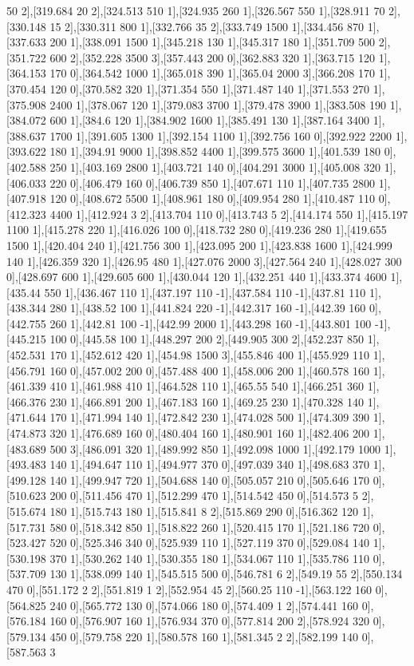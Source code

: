 {50 2],[319.684 20 2],[324.513 510 1],[324.935 260 1],[326.567 550 1],[328.911 70 2],[330.148 15 2],[330.311 800 1],[332.766 35 2],[333.749 1500 1],[334.456 870 1],[337.633 200 1],[338.091 1500 1],[345.218 130 1],[345.317 180 1],[351.709 500 2],[351.722 600 2],[352.228 3500 3],[357.443 200 0],[362.883 320 1],[363.715 120 1],[364.153 170 0],[364.542 1000 1],[365.018 390 1],[365.04 2000 3],[366.208 170 1],[370.454 120 0],[370.582 320 1],[371.354 550 1],[371.487 140 1],[371.553 270 1],[375.908 2400 1],[378.067 120 1],[379.083 3700 1],[379.478 3900 1],[383.508 190 1],[384.072 600 1],[384.6 120 1],[384.902 1600 1],[385.491 130 1],[387.164 3400 1],[388.637 1700 1],[391.605 1300 1],[392.154 1100 1],[392.756 160 0],[392.922 2200 1],[393.622 180 1],[394.91 9000 1],[398.852 4400 1],[399.575 3600 1],[401.539 180 0],[402.588 250 1],[403.169 2800 1],[403.721 140 0],[404.291 3000 1],[405.008 320 1],[406.033 220 0],[406.479 160 0],[406.739 850 1],[407.671 110 1],[407.735 2800 1],[407.918 120 0],[408.672 5500 1],[408.961 180 0],[409.954 280 1],[410.487 110 0],[412.323 4400 1],[412.924 3 2],[413.704 110 0],[413.743 5 2],[414.174 550 1],[415.197 1100 1],[415.278 220 1],[416.026 100 0],[418.732 280 0],[419.236 280 1],[419.655 1500 1],[420.404 240 1],[421.756 300 1],[423.095 200 1],[423.838 1600 1],[424.999 140 1],[426.359 320 1],[426.95 480 1],[427.076 2000 3],[427.564 240 1],[428.027 300 0],[428.697 600 1],[429.605 600 1],[430.044 120 1],[432.251 440 1],[433.374 4600 1],[435.44 550 1],[436.467 110 1],[437.197 110 -1],[437.584 110 -1],[437.81 110 1],[438.344 280 1],[438.52 100 1],[441.824 220 -1],[442.317 160 -1],[442.39 160 0],[442.755 260 1],[442.81 100 -1],[442.99 2000 1],[443.298 160 -1],[443.801 100 -1],[445.215 100 0],[445.58 100 1],[448.297 200 2],[449.905 300 2],[452.237 850 1],[452.531 170 1],[452.612 420 1],[454.98 1500 3],[455.846 400 1],[455.929 110 1],[456.791 160 0],[457.002 200 0],[457.488 400 1],[458.006 200 1],[460.578 160 1],[461.339 410 1],[461.988 410 1],[464.528 110 1],[465.55 540 1],[466.251 360 1],[466.376 230 1],[466.891 200 1],[467.183 160 1],[469.25 230 1],[470.328 140 1],[471.644 170 1],[471.994 140 1],[472.842 230 1],[474.028 500 1],[474.309 390 1],[474.873 320 1],[476.689 160 0],[480.404 160 1],[480.901 160 1],[482.406 200 1],[483.689 500 3],[486.091 320 1],[489.992 850 1],[492.098 1000 1],[492.179 1000 1],[493.483 140 1],[494.647 110 1],[494.977 370 0],[497.039 340 1],[498.683 370 1],[499.128 140 1],[499.947 720 1],[504.688 140 0],[505.057 210 0],[505.646 170 0],[510.623 200 0],[511.456 470 1],[512.299 470 1],[514.542 450 0],[514.573 5 2],[515.674 180 1],[515.743 180 1],[515.841 8 2],[515.869 290 0],[516.362 120 1],[517.731 580 0],[518.342 850 1],[518.822 260 1],[520.415 170 1],[521.186 720 0],[523.427 520 0],[525.346 340 0],[525.939 110 1],[527.119 370 0],[529.084 140 1],[530.198 370 1],[530.262 140 1],[530.355 180 1],[534.067 110 1],[535.786 110 0],[537.709 130 1],[538.099 140 1],[545.515 500 0],[546.781 6 2],[549.19 55 2],[550.134 470 0],[551.172 2 2],[551.819 1 2],[552.954 45 2],[560.25 110 -1],[563.122 160 0],[564.825 240 0],[565.772 130 0],[574.066 180 0],[574.409 1 2],[574.441 160 0],[576.184 160 0],[576.907 160 1],[576.934 370 0],[577.814 200 2],[578.924 320 0],[579.134 450 0],[579.758 220 1],[580.578 160 1],[581.345 2 2],[582.199 140 0],[587.563 3 }
